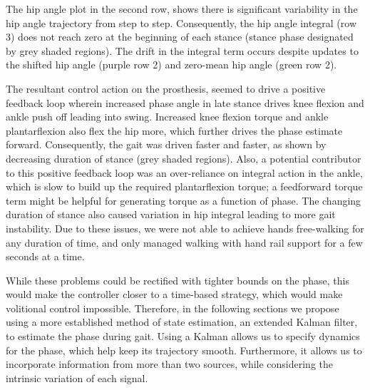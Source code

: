 The hip angle plot in the second row, shows there is significant variability in
the hip angle trajectory from step to step. Consequently, the hip angle integral
(row 3) does not reach zero at the beginning of each stance (stance phase
designated by grey shaded regions). The drift in the integral term occurs
despite updates to the shifted hip angle (purple row 2) and zero-mean hip angle
(green row 2). 

The resultant control action on the prosthesis, seemed to drive a positive
feedback loop wherein increased phase angle in late stance drives knee flexion
and ankle push off leading into swing. Increased knee flexion torque and ankle
plantarflexion also flex the hip more, which further drives the phase estimate
forward. Consequently, the gait was driven faster and faster, as shown by
decreasing duration of stance (grey shaded regions). Also, a potential
contributor to this positive feedback loop was an over-reliance on integral
action in the ankle, which is slow to build up the required plantarflexion
torque; a feedforward torque term might be helpful for generating torque as a
function of phase. The changing duration of stance also caused variation in hip
integral leading to more gait instability. Due to these issues, we were not able
to achieve hands free-walking for any duration of time, and only managed walking
with hand rail support for a few seconds at a time.

While these problems could be rectified with tighter bounds on the phase, this
would make the controller closer to a time-based strategy, which would make
volitional control impossible. Therefore, in the following sections we propose
using a more established method of state estimation, an extended Kalman filter,
to estimate the phase during gait. Using a Kalman allows us to specify dynamics
for the phase, which help keep its trajectory smooth. Furthermore, it allows us
to incorporate information from more than two sources, while considering the
intrinsic variation of each signal.
